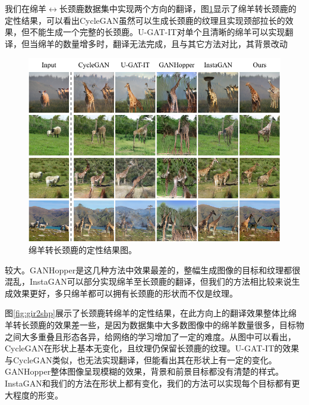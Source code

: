 我们在绵羊$\leftrightarrow$长颈鹿数据集中实现两个方向的翻译，图\ref{fig:shp2gir}显示了绵羊转长颈鹿的定性结果，可以看出CycleGAN虽然可以生成长颈鹿的纹理且实现颈部拉长的效果，但不能生成一个完整的长颈鹿。U-GAT-IT对单个且清晰的绵羊可以实现翻译，但当绵羊的数量增多时，翻译无法完成，且与其它方法对比，其背景改动
\begin{figure}[ht]
    \centering
  \includegraphics[width=\textwidth]{figs/shp2gir.pdf}
  \caption{绵羊转长颈鹿的定性结果图。}
  \label{fig:shp2gir}
\end{figure}
较大。GANHopper是这几种方法中效果最差的，整幅生成图像的目标和纹理都很混乱，InstaGAN可以部分实现绵羊至长颈鹿的翻译，但我们的方法相比较来说生成效果更好，多只绵羊都可以拥有长颈鹿的形状而不仅是纹理。


图\ref{fig:gir2shp}展示了长颈鹿转绵羊的定性结果，在此方向上的翻译效果整体比绵羊转长颈鹿的效果差一些，是因为数据集中大多数图像中的绵羊数量很多，目标物之间大多重叠且形态各异，给网络的学习增加了一定的难度。从图中可以看出，CycleGAN在形状上基本无变化，且纹理仍保留长颈鹿的纹理。U-GAT-IT的效果与CycleGAN类似，也无法实现翻译，但能看出其在形状上有一定的变化。GANHopper整体图像呈现模糊的效果，背景和前景目标都没有清楚的样式。InstaGAN和我们的方法在形状上都有变化，我们的方法可以实现每个目标都有更大程度的形变。


